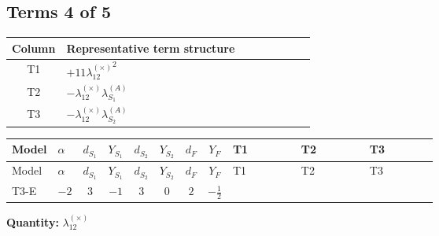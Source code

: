 \documentclass[8pt]{article}
\begin{document}
\begin{landscape}
\subsection*{Terms 4 of 5}
\begin{center}
\begin{tabular}{@{}c >{\raggedright\arraybackslash}p{0.82\linewidth}@{}}
\toprule
Column & Representative term structure \\
\midrule
T1 & \(\displaystyle +11 {\lambda_{12}^{(\times)}}^2\) \\
\midrule
T2 & \(\displaystyle -{\lambda_{12}^{(\times)}} {\lambda_{S_1}^{(A)}}\) \\
\midrule
T3 & \(\displaystyle -{\lambda_{12}^{(\times)}} {\lambda_{S_2}^{(A)}}\) \\
\midrule
\bottomrule
\end{tabular}
\end{center}
\smallskip
\tiny
\begin{longtable}{@{}llcccccc >{\raggedright\arraybackslash}p{0.21\linewidth} >{\raggedright\arraybackslash}p{0.21\linewidth} >{\raggedright\arraybackslash}p{0.21\linewidth}@{}}
\toprule
Model & $\alpha$ & $d_{S_1}$ & $Y_{S_1}$ & $d_{S_2}$ & $Y_{S_2}$ & $d_F$ & $Y_F$ & T1 & T2 & T3 \\
\midrule
\endfirsthead
\toprule
Model & $\alpha$ & $d_{S_1}$ & $Y_{S_1}$ & $d_{S_2}$ & $Y_{S_2}$ & $d_F$ & $Y_F$ & T1 & T2 & T3 \\
\midrule
\endhead
T3-E & $-2$ & $3$ & $-1$ & $3$ & $0$ & $2$ & $-\frac{1}{2}$ & \scriptsize\adjustbox{max width=\linewidth}{$\begin{gathered} +11 {\lambda_{12}^{(\times)}}^2\end{gathered}$} & \scriptsize\adjustbox{max width=\linewidth}{$\begin{gathered} -{\lambda_{12}^{(\times)}} {\lambda_{S_1}^{(A)}}\end{gathered}$} & \scriptsize\adjustbox{max width=\linewidth}{$\begin{gathered} -{\lambda_{12}^{(\times)}} {\lambda_{S_2}^{(A)}}\end{gathered}$} \\
\midrule
\bottomrule
\end{longtable}
\clearpage
\noindent\textbf{Quantity: }$\lambda_{12}^{(\times)}$\par\smallskip

\end{landscape}
\end{document}
